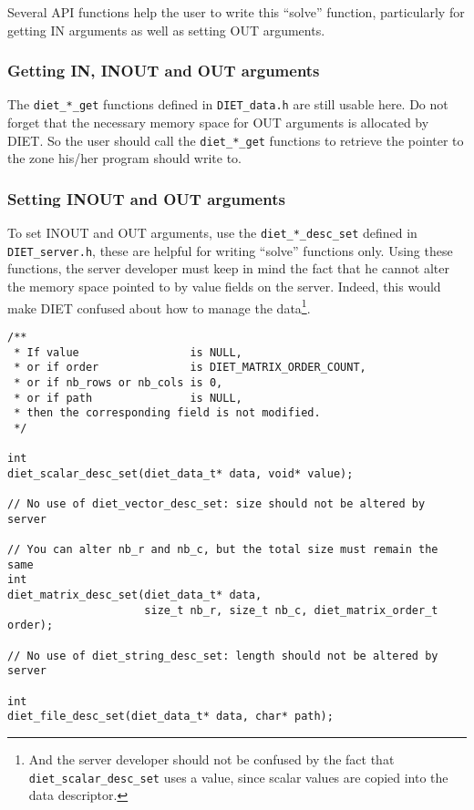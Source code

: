 Several API functions help the user to write this ``solve''
function, particularly for getting IN arguments as well as setting
OUT arguments.

\subsubsection*{Getting IN, INOUT and OUT arguments}

The \texttt{diet\_*\_get} functions defined in \texttt{DIET\_data.h} are still
usable here. Do not forget that the necessary memory space for OUT arguments is
allocated by DIET. So the user should call the \texttt{diet\_*\_get} functions
to retrieve the pointer to the zone his/her program should write to.

\subsubsection*{Setting INOUT and OUT arguments}

To set INOUT and OUT arguments, use the \texttt{diet\_*\_desc\_set} defined
in \texttt{DIET\_server.h}, these are helpful for writing ``solve''
functions only. Using these functions, the server developer must keep in
mind the fact that he cannot alter the memory space pointed to by
value fields on the server. Indeed, this would make DIET confused
about how to manage the data{\footnote{And the server developer
should not be confused by the fact that
\texttt{diet\_scalar\_desc\_set} uses a value, since scalar values
are copied into the data descriptor.}}.

{\footnotesize
\begin{verbatim}
/**
 * If value                 is NULL,
 * or if order              is DIET_MATRIX_ORDER_COUNT,
 * or if nb_rows or nb_cols is 0,
 * or if path               is NULL,
 * then the corresponding field is not modified.
 */

int
diet_scalar_desc_set(diet_data_t* data, void* value);

// No use of diet_vector_desc_set: size should not be altered by server

// You can alter nb_r and nb_c, but the total size must remain the same
int
diet_matrix_desc_set(diet_data_t* data,
                     size_t nb_r, size_t nb_c, diet_matrix_order_t order);

// No use of diet_string_desc_set: length should not be altered by server

int
diet_file_desc_set(diet_data_t* data, char* path);
\end{verbatim}
}



